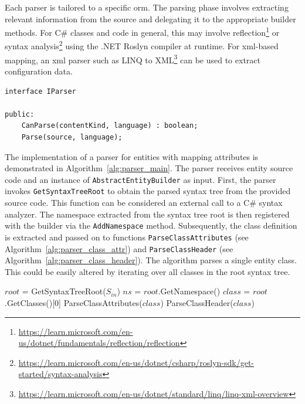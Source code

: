 Each parser is tailored to a specific \acrshort{orm}. The parsing phase involves extracting relevant information from the source and delegating it to the appropriate builder methods. For C\# classes and code in general, this may involve  reflection\footnote{\url{https://learn.microsoft.com/en-us/dotnet/fundamentals/reflection/reflection}} or syntax analysis\footnote{\url{https://learn.microsoft.com/en-us/dotnet/csharp/roslyn-sdk/get-started/syntax-analysis}} using the .NET Roslyn compiler at runtime. For \acrshort{xml}-based mapping, an \acrshort{xml} parser such as LINQ to XML\footnote{\url{https://learn.microsoft.com/en-us/dotnet/standard/linq/linq-xml-overview}} can be used to extract configuration data.

 \begin{lstlisting}[caption={IParser interface structure}, language=pseudo, label={lst:parser}]
interface IParser

public:
    CanParse(contentKind, language) : boolean;
    Parse(source, language);
 \end{lstlisting}

The implementation of a parser for entities with mapping attributes is demonstrated in Algorithm~\ref{alg:parser_main}. The parser receives entity source code and an instance of \texttt{AbstractEntityBuilder} as input. First, the parser invokes \texttt{GetSyntaxTreeRoot} to obtain the parsed syntax tree from the provided source code. This function can be considered an external call to a C\# syntax analyzer. The namespace extracted from the syntax tree root is then registered with the builder via the \texttt{AddNamespace} method. Subsequently, the class definition is extracted and passed on to functions \texttt{ParseClassAttributes} (see Algorithm~\ref{alg:parser_class_attr}) and \texttt{ParseClassHeader} (see Algorithm~\ref{alg:parser_class_header}). The algorithm parses a single entity class. This could be easily altered by iterating over all classes in the root syntax tree.

\begin{algorithm}[!htp]
    \small
    \DontPrintSemicolon
    
    
    $root$ = GetSyntaxTreeRoot($S_{in}$)\;
    \BlankLine
    $ns$ = $root$.GetNamespace()\;
    \BlankLine
    $class$ = $root$.GetClasses()[0]\;
    ParseClassAttributes($class$)\;
    ParseClassHeader($class$)\;
    
    \caption{Entity mapping parser}
    \label{alg:parser_main}
\end{algorithm}


